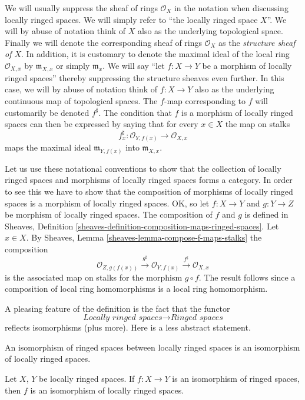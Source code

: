 \noindent
We will usually suppress the sheaf of rings $\mathcal{O}_X$
in the notation when discussing locally ringed spaces. We will
simply refer to ``the locally ringed space $X$''.
We will by abuse of notation think of $X$ also as
the underlying topological space. Finally we will denote
the corresponding sheaf of rings
$\mathcal{O}_X$ as the {\it structure sheaf of $X$}.
In addition, it is customary to denote the maximal ideal
of the local ring $\mathcal{O}_{X, x}$ by
$\mathfrak{m}_{X, x}$ or simply $\mathfrak{m}_x$.
We will say ``let $f : X \to Y$ be a morphism of locally ringed
spaces'' thereby suppressing the structure sheaves even further.
In this case, we will by abuse of notation think of $f : X\to Y$
also as the underlying continuous map of topological spaces.
The $f$-map corresponding to $f$ will customarily
be denoted $f^\sharp$. The condition that $f$ is a morphism
of locally ringed spaces can then be expressed by saying that
for every $x\in X$ the map on stalks
$$
f^\sharp_x : \mathcal{O}_{Y, f(x)} \longrightarrow \mathcal{O}_{X, x}
$$
maps the maximal ideal $\mathfrak m_{Y, f(x)}$ into
$\mathfrak m_{X, x}$.

\medskip\noindent
Let us use these notational conventions to show that the
collection of locally ringed spaces and morphisms of locally
ringed spaces forms a category. In order to see this we have
to show that the composition of morphisms of locally ringed
spaces is a morphism of locally ringed spaces. OK, so let
$f : X \to Y$ and $g : Y \to Z$ be morphism of locally
ringed spaces. The composition of $f$ and $g$ is defined in
Sheaves, Definition \ref{sheaves-definition-composition-maps-ringed-spaces}.
Let $x \in X$. By
Sheaves, Lemma \ref{sheaves-lemma-compose-f-maps-stalks}
the composition
$$
\mathcal{O}_{Z, g(f(x))}
\xrightarrow{g^\sharp}
\mathcal{O}_{Y, f(x)}
\xrightarrow{f^\sharp}
\mathcal{O}_{X, x}
$$
is the associated map on stalks for the morphism $g \circ f$.
The result follows since a composition of local ring
homomorphisms is a local ring homomorphism.

\medskip\noindent
A pleasing feature of the definition is the fact that the functor
$$
\textit{Locally ringed spaces}
\longrightarrow
\textit{Ringed spaces}
$$
reflects isomorphisms (plus more).
Here is a less abstract statement.

\begin{lemma}
\label{lemma-isomorphism-locally-ringed}
\begin{reference}
\cite[Chapter II, \S 1, no. 32, p. 225]{FAC}
\end{reference}
\begin{slogan}
An isomorphism of ringed spaces between locally ringed spaces is an
isomorphism of locally ringed spaces.
\end{slogan}
Let $X$, $Y$ be locally ringed spaces.
If $f : X \to Y$ is an isomorphism of
ringed spaces, then $f$ is an isomorphism
of locally ringed spaces.
\end{lemma}

